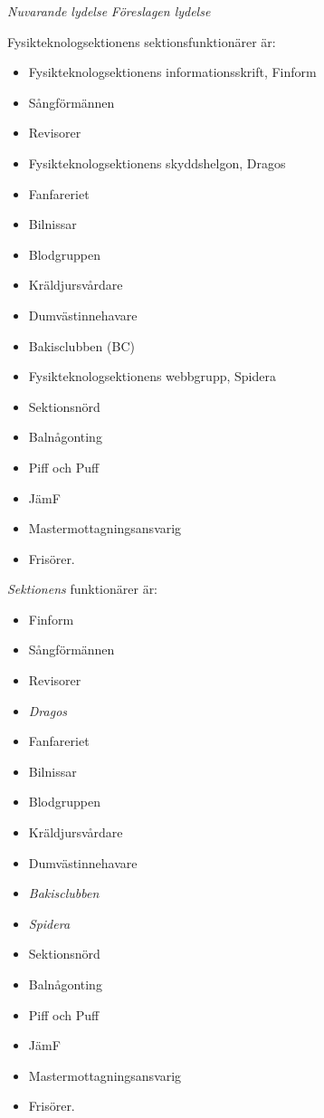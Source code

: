\documentclass{article}
\newenvironment{lydelse}
    {\begin{paracol}{2}%
        \emph{Nuvarande lydelse}%
        \switchcolumn%
        \emph{Föreslagen lydelse}%
    \end{paracol}%
    \begin{enumerate}[label=\thesubsection.\arabic*]%
    \begin{paracol}{2}%
    }{\end{paracol}\end{enumerate}}
\begin{document}
\begin{lydelse}
    \setcounter{section}{8}
    
    \item Fysikteknologsektionens sektionsfunktionärer är:
	\begin{itemize}
		\item Fysikteknologsektionens informationsskrift, Finform
		\item Sångförmännen
		\item Revisorer
		\item Fysikteknologsektionens skyddshelgon, Dragos
		\item Fanfareriet
		\item Bilnissar
		\item Blodgruppen
		\item Kräldjursvårdare
		\item Dumvästinnehavare
		\item Bakisclubben (BC)
		\item Fysikteknologsektionens webbgrupp, Spidera
		\item Sektionsnörd
		\item Balnågonting
		\item Piff och Puff
		\item JämF
		\item Mastermottagningsansvarig
		\item Frisörer.
	\end{itemize}
    
    \setcounter{section}{7}
    \switchcolumn
    
    \item \emph{Sektionens} funktionärer är:
    \begin{itemize}
        \item Finform\vspace{1.2em}
    	\item Sångförmännen
    	\item Revisorer
    	\item \emph{Dragos}\vspace{1.2em}
    	\item Fanfareriet
    	\item Bilnissar
    	\item Blodgruppen
    	\item Kräldjursvårdare
    	\item Dumvästinnehavare
    	\item \emph{Bakisclubben}
    	\item \emph{Spidera} \vspace{1.2em}
    	\item Sektionsnörd
    	\item Balnågonting
    	\item Piff och Puff
    	\item JämF
    	\item Mastermottagningsansvarig
    	\item Frisörer.
    \end{itemize}
    
\end{lydelse}
\end{document}
